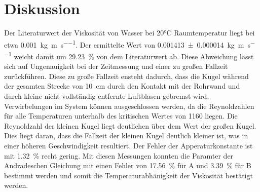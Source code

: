 \section{Diskussion}
\label{sec:Diskussion}

Der Literaturwert der Viskosität von Wasser bei 20°C Raumtemperatur
liegt bei etwa \SI{0.001}{\kilo\gram\per\meter\per\second}. 
Der ermittelte Wert von \SI{0.001413+-0.000014}{\kilo\gram\per\meter\per\second}
weicht damit um \SI{29.23}{\percent} von dem Literaturwert ab. 
Diese Abweichung lässt sich auf Ungenauigkeit bei der Zeitmessung und einer
zu großen Fallzeit zurückführen. 
Diese zu große Fallzeit ensteht dadurch, dass die Kugel während der
gesamten Strecke von \SI{10}{\centi\meter} durch den Kontakt mit der Rohrwand 
und durch kleine nicht vollständig entfernte Luftblasen gebremst wird.
Verwirbelungen im System können ausgeschlossen werden, da die Reynoldzahlen 
für alle Temperaturen unterhalb des kritischen Wertes von 1160 liegen. 
Die Reynoldzahl der kleinen Kugel liegt deutlichen über dem Wert 
der großen Kugel. Dies liegt daran, dass die Fallzeit der kleinen
Kugel deutlich kleiner ist, was in einer höheren Geschwindigkeit resultiert.
Der Fehler der Apperaturkonstante ist mit \SI{1.32}{\percent} recht gering.
Mit diesen Messungen konnten die Paramter der Andradeschen Gleichung mit einen 
Fehler von \SI{17.56}{\percent} für A und \SI{3.39}{\percent} für B bestimmt werden
und somit die Temperaturabhänigkeit der Viskosität bestätigt werden. 